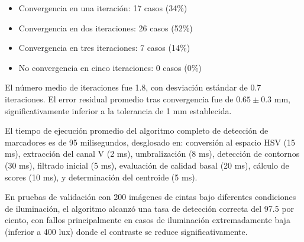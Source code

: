 \begin{itemize}
\item Convergencia en una iteración: 17 casos (34\%)
\item Convergencia en dos iteraciones: 26 casos (52\%)
\item Convergencia en tres iteraciones: 7 casos (14\%)
\item No convergencia en cinco iteraciones: 0 casos (0\%)
\end{itemize}

El número medio de iteraciones fue 1.8, con desviación estándar de 0.7 iteraciones. El error residual promedio tras convergencia fue de $0.65 \pm 0.3$ mm, significativamente inferior a la tolerancia de 1 mm establecida.

El tiempo de ejecución promedio del algoritmo completo de detección de marcadores es de 95 milisegundos, desglosado en: conversión al espacio HSV (15 ms), extracción del canal V (2 ms), umbralización (8 ms), detección de contornos (30 ms), filtrado inicial (5 ms), evaluación de calidad basal (20 ms), cálculo de scores (10 ms), y determinación del centroide (5 ms).

En pruebas de validación con 200 imágenes de cintas bajo diferentes condiciones de iluminación, el algoritmo alcanzó una tasa de detección correcta del 97.5 por ciento, con fallos principalmente en casos de iluminación extremadamente baja (inferior a 400 lux) donde el contraste se reduce significativamente.
